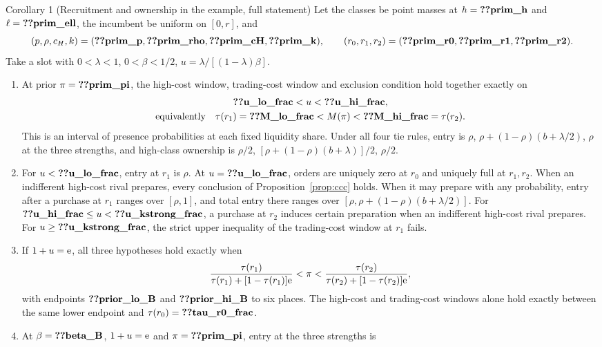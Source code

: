 \begin{named}{Corollary 1 (Recruitment and ownership in the example, full statement)}
Let the classes be point masses at \(h=\reg{prim_h}\) and \(\ell=\reg{prim_ell}\), the incumbent be uniform on
\([0,r]\), and
\[
(p,\rho,c_H,k)=(\reg{prim_p},\reg{prim_rho},\reg{prim_cH},\reg{prim_k}),\qquad
(r_0,r_1,r_2)=(\reg{prim_r0},\reg{prim_r1},\reg{prim_r2}).
\]
Take a slot with \(0<\lambda<1\), \(0<\beta<1/2\), \(u=\lambda/[(1-\lambda)\beta]\).
\begin{enumerate}[label=(\alph*),leftmargin=2em]
\item At prior \(\pi=\reg{prim_pi}\), the high-cost window, trading-cost window and exclusion condition hold
together exactly on
\[
\begin{gathered}
\reg{u_lo_frac}<u<\reg{u_hi_frac},\\
\text{equivalently}\quad
\tau(r_1)=\reg{M_lo_frac}<M(\pi)<\reg{M_hi_frac}=\tau(r_2).
\end{gathered}
\]
This is an interval of presence probabilities at each fixed liquidity share. Under all four tie rules, entry is
\(\rho\), \(\rho+(1-\rho)(b+\lambda/2)\), \(\rho\) at the three strengths, and high-class ownership is
\(\rho/2\), \([\rho+(1-\rho)(b+\lambda)]/2\), \(\rho/2\).
\item For \(u<\reg{u_lo_frac}\), entry at \(r_1\) is \(\rho\). At \(u=\reg{u_lo_frac}\), orders are uniquely zero
at \(r_0\) and uniquely full at \(r_1,r_2\). When an indifferent high-cost rival prepares, every conclusion
of Proposition~\ref{prop:ccc} holds. When it may prepare with any probability, entry after a purchase at \(r_1\)
ranges over \([\rho,1]\), and total entry there ranges over
\([\rho,\rho+(1-\rho)(b+\lambda/2)]\). For
\(\reg{u_hi_frac}\le u<\reg{u_kstrong_frac}\), a purchase at \(r_2\) induces certain preparation when an
indifferent high-cost rival prepares. For \(u\ge\reg{u_kstrong_frac}\), the strict upper inequality of the
trading-cost window at \(r_1\) fails.
\item If \(1+u=\mathrm{e}\), all three hypotheses hold exactly when
\[
\frac{\tau(r_1)}{\tau(r_1)+[1-\tau(r_1)]\mathrm{e}}<\pi<
\frac{\tau(r_2)}{\tau(r_2)+[1-\tau(r_2)]\mathrm{e}},
\]
with endpoints \(\reg{prior_lo_B}\) and \(\reg{prior_hi_B}\) to six places. The high-cost and trading-cost windows
alone hold exactly between the same lower endpoint and \(\tau(r_0)=\reg{tau_r0_frac}\).
\item At \(\beta=\reg{beta_B}\), \(1+u=\mathrm{e}\) and \(\pi=\reg{prim_pi}\), entry at the three strengths is

\end{enumerate}
\end{named}
